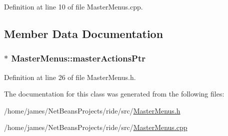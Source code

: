 Definition at line 10 of file Master\-Menus.\-cpp.



\subsection{Member Data Documentation}
\hypertarget{class_master_menus_ab5ba9c46b8ad0e6eb11345e055ac469d}{
\subsubsection[{master\-Actions\-Ptr}]{$\ast$ Master\-Menus\-::master\-Actions\-Ptr\hspace{0.3cm}{\ttfamily [private]}}}\label{class_master_menus_ab5ba9c46b8ad0e6eb11345e055ac469d}


Definition at line 26 of file Master\-Menus.\-h.



The documentation for this class was generated from the following files\-:\begin{DoxyCompactItemize}
\item 
/home/james/\-Net\-Beans\-Projects/ride/src/\hyperlink{_master_menus_8h}{Master\-Menus.\-h}\item 
/home/james/\-Net\-Beans\-Projects/ride/src/\hyperlink{_master_menus_8cpp}{Master\-Menus.\-cpp}\end{DoxyCompactItemize}
